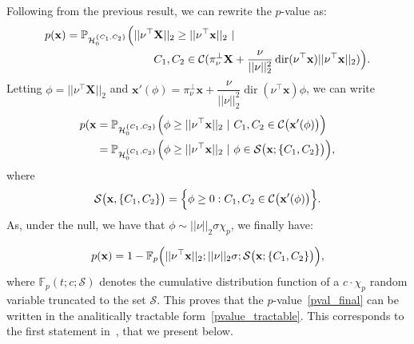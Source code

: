\documentclass[a4paper,11pt]{article}
\theoremstyle{plain}
\newcommand{\norm}[1]{||#1||}
\newcommand{\1}{\mathbf{1}}
\newcommand{\projnu}{\pi_{\nu}^{\perp}}
\begin{document}
Following from the previous result, we can rewrite the  $p$-value as:
\begin{equation}
  \begin{aligned}
    p(\mathbf{x}) = \mathbb{P}_{\mathcal{H}_0^{\{C_1,C_2\}}}\Bigl(\norm{\nu^\top & \mathbf{X}}_2  \geq \norm{\nu^\top \mathbf{x}}_2 ~|~ \\
  & C_1, C_2 \in \mathcal{C}(\projnu \mathbf{X} + \dfrac{\nu}{\norm{\nu}^2_2} \operatorname{dir}(\nu^\top \mathbf{x}) \norm{\nu^\top \mathbf{x}}_2  )  \Bigr).
\end{aligned}
\end{equation}
Letting $\phi = \norm{\nu^\top \mathbf{X}}_2$ and $\mathbf{x}'(\phi) = \projnu \mathbf{x} + \dfrac{\nu}{\norm{\nu}_2^2} \operatorname{dir}(\nu^\top \mathbf{x})\phi $, we can write
\begin{equation}
  \begin{aligned}
    p(\mathbf{x} &= \mathbb{P}_{\mathcal{H}_0^{\{C_1,C_2\}}}\Bigl(\phi \geq \norm{\nu^\top \mathbf{x}}_2 ~|~ C_1,C_2 \in \mathcal{C}\bigl(\mathbf{x}'(\phi)\bigr)\Bigr) \\
         &= \mathbb{P}_{\mathcal{H}_0^{\{C_1,C_2\}}}\Bigl(\phi \geq \norm{\nu^\top \mathbf{x}}_2 ~|~ \phi \in \mathcal{S}\bigr(\mathbf{x}; \{C_1,C_2\}\bigl)\Bigr),
\end{aligned}
\end{equation}
where
\begin{equation}\label{set_S}
\mathcal{S}\bigl(\mathbf{x},\{C_1,C_2\}\bigr) = \Bigl\{\phi \geq 0: C_1,C_2 \in \mathcal{C}\bigl(\mathbf{x}'(\phi)\bigr)\Bigr\}.
\end{equation}
As, under the null, we have that $\phi \sim \norm{\nu}_2\sigma\chi_p$, we finally have:

\begin{equation}\label{pvalue_tractable}
  p(\mathbf{x}) = 1 - \mathbb{F}_p\Bigl(\norm{\nu^\top \mathbf{x}}_2;\norm{\nu}_2\sigma;\mathcal{S}\bigl(\mathbf{x};\{C_1,C_2\}\bigr)\Bigr),
\end{equation}
where $\mathbb{F}_p(t;c;\mathcal{S})$ denotes the cumulative distribution function of a $c\cdot\chi_p$ random variable truncated to the set $\mathcal{S}$. This proves that the $p$-value~\eqref{pval_final} can be written in the analitically tractable form~\eqref{pvalue_tractable}. This corresponds to the first statement in~\cite[Theorem 1]{Gao}, that we present below.
\end{document}
